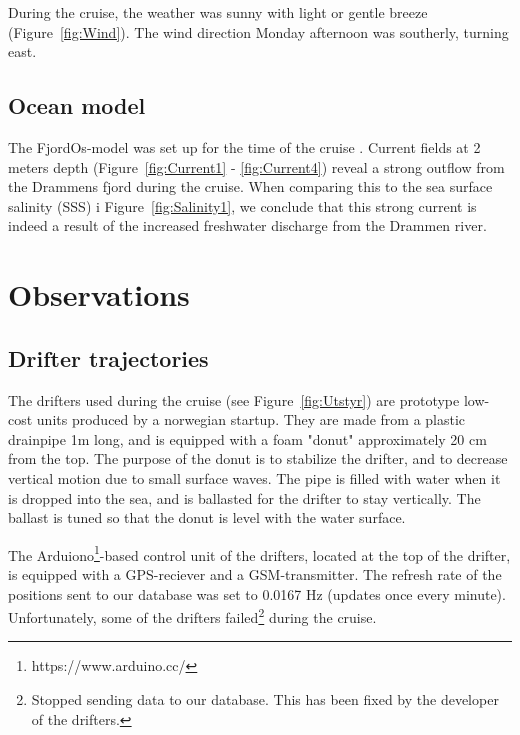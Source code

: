 \documentclass[12pt,a4paper,english]{article}
\begin{document}
During the cruise, the weather was sunny with light or gentle breeze (Figure~\ref{fig:Wind}). The wind direction Monday afternoon was southerly, turning east. 

\subsection{Ocean model}
The FjordOs-model was set up for the time of the cruise \citep{roed:etal:2016}. Current fields at 2 meters depth (Figure~\ref{fig:Current1} - \ref{fig:Current4}) reveal a strong outflow from the Drammens fjord during the cruise. When comparing this to the sea surface salinity (SSS) i Figure~\ref{fig:Salinity1}, we conclude that this strong current is indeed a result of the increased freshwater discharge from the Drammen river.



\clearpage

\section{Observations}


\subsection{Drifter trajectories}
The drifters used during the cruise (see Figure~\ref{fig:Utstyr}) are prototype low-cost units produced by a norwegian startup. They are made from a plastic drainpipe 1m long, and is equipped with a foam "donut" approximately 20 cm from the top. The purpose of the donut is to stabilize the drifter, and to decrease vertical motion due to small surface waves. The pipe is filled with water when it is dropped into the sea, and is  ballasted for the drifter to stay vertically. The ballast is tuned so that the donut is level with the water surface.

The Arduiono\footnote{https://www.arduino.cc/}-based control unit of the drifters, located at the top of the drifter, is equipped with a GPS-reciever and a GSM-transmitter. The refresh rate of the positions sent to our database was set to 0.0167 Hz (updates once every minute). Unfortunately, some of the drifters failed\footnote{Stopped sending data to our database. This has been fixed by the developer of the drifters.} during the cruise.
\end{document}
